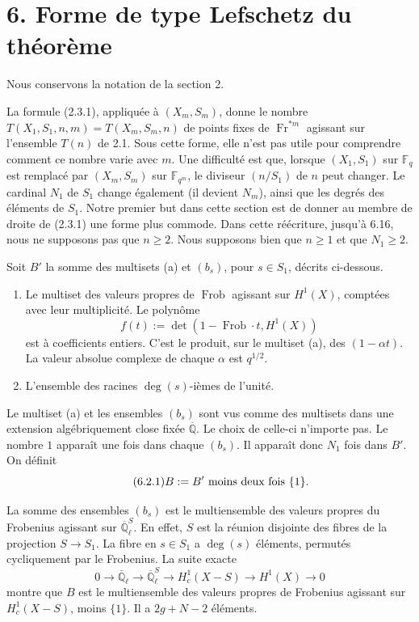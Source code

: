 \documentclass[10pt]{article}
\newcommand{\Fq}{\mathbb F_q}
\newcommand{\Fqm}{\mathbb F_{q^m}}
\newcommand{\Ql}{\overline{\mathbb Q}_{\ell}}
\newcommand{\Fr}{\operatorname{Fr}}
\newcommand{\Frob}{\operatorname{Frob}}
\newcommand{\degm}{\operatorname{deg}}
\theoremstyle{deligne}
\newcommand{\heading}[1]{\vspace{0.7em}\noindent{\bfseries #1}\quad}
\begin{document}
\section*{6. Forme de type Lefschetz du théorème}

Nous conservons la notation de la section 2.

\heading{6.1.} La formule (2.3.1), appliquée à $(X_m,S_m)$, donne le nombre $T(X_1,S_1,n,m)=T(X_m,S_m,n)$ de points fixes de $\Fr^{*m}$ agissant sur l'ensemble $T(n)$ de 2.1. Sous cette forme, elle n'est pas utile pour comprendre comment ce nombre varie avec $m$. Une difficulté est que, lorsque $(X_1,S_1)$ sur $\Fq$ est remplacé par $(X_m,S_m)$ sur $\Fqm$, le diviseur $(n/S_1)$ de $n$ peut changer. Le cardinal $N_1$ de $S_1$ change également (il devient $N_m$), ainsi que les degrés des éléments de $S_1$. Notre premier but dans cette section est de donner au membre de droite de (2.3.1) une forme plus commode. Dans cette réécriture, jusqu'à 6.16, nous ne supposons pas que $n\ge2$. Nous supposons bien que $n\ge1$ et que $N_1\ge2$.

\heading{6.2.} Soit $B'$ la somme des multisets (a) et $(b_s)$, pour $s\in S_1$, décrits ci-dessous.
\begin{enumerate}[label=(\alph*)]
\item Le multiset des valeurs propres de $\Frob$ agissant sur $H^1(X)$, comptées avec leur multiplicité. Le polynôme
\[
f(t):=\det(1-\Frob\cdot t,H^1(X))
\]
est à coefficients entiers. C'est le produit, sur le multiset (a), des $(1-\alpha t)$. La valeur absolue complexe de chaque $\alpha$ est $q^{1/2}$.
\item[$(b_s)$] L'ensemble des racines $\degm(s)$-ièmes de l'unité.
\end{enumerate}
Le multiset (a) et les ensembles $(b_s)$ sont vus comme des multisets dans une extension algébriquement close fixée $\overline{\mathbb Q}$. Le choix de celle-ci n'importe pas. Le nombre $1$ apparaît une fois dans chaque $(b_s)$. Il apparaît donc $N_1$ fois dans $B'$. On définit
\begin{equation}\tag{6.2.1}
B:=B'\hbox{ moins deux fois }\{1\}.
\end{equation}



La somme des ensembles $(b_s)$ est le multiensemble des valeurs propres du Frobenius agissant sur $\Ql^S$. En effet, $S$ est la réunion disjointe des fibres de la projection $S\to S_1$. La fibre en $s\in S_1$ a $\degm(s)$ éléments, permutés cycliquement par le Frobenius. La suite exacte
\begin{equation}\tag{6.2.2}
0\longrightarrow \Ql\longrightarrow \Ql^S\longrightarrow H^1_c(X-S)\longrightarrow H^1(X)\longrightarrow0
\end{equation}
montre que $B$ est le multiensemble des valeurs propres de Frobenius agissant sur $H^1_c(X-S)$, moins $\{1\}$. Il a $2g+N-2$ éléments.
\end{document}
